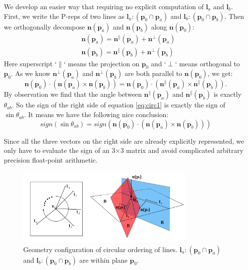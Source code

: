 \documentclass[10pt,journal,compsoc]{IEEEtran}
\begin{document}
We develop an easier way that requiring no explicit computation of $\bm{l}_a$ and $\bm{l}_b$. First, we write the P-reps of two lines as $\bm{l}_a\colon(\bm{p}_0\cap\bm{p}_a)$ and $\bm{l}_b\colon(\bm{p}_0\cap\bm{p}_b)$. Then we orthogonally decompose $\bm{n}(\bm{p}_a)$ and $\bm{n}(\bm{p}_b)$ along $\bm{n}(\bm{p}_0)$:
\begin{equation}
\begin{split}
&\bm{n}(\bm{p}_a)= \bm{n}^\parallel(\bm{p}_a) + \bm{n}^\perp(\bm{p}_a)\\
&\bm{n}(\bm{p}_b)= \bm{n}^\parallel(\bm{p}_b) + \bm{n}^\perp(\bm{p}_b)
\end{split}
\end{equation}
Here superscript `$\parallel$` means the projection on $\bm{p}_0$ and `$\perp$` means orthogonal to $\bm{p}_0$. As we know $\bm{n}^\perp(\bm{p}_a)$ and $\bm{n}^\perp(\bm{p}_b)$ are both parallel to $\bm{n}(\bm{p}_0)$, we get:
\begin{equation}
\label{eq:circ1}
\bm{n}(\bm{p}_0) \cdot (\bm{n}(\bm{p}_a) \times \bm{n}(\bm{p}_b)) = \bm{n}(\bm{p}_0) \cdot (\bm{n}^\parallel(\bm{p}_a) \times \bm{n}^\parallel(\bm{p}_b)).
\end{equation}
By observation we find that the angle between $\bm{n}^\parallel(\bm{p}_a)$ and $\bm{n}^\parallel(\bm{p}_b)$ is exactly $\theta_{ab}$. So the sign of the right side of equation \ref{eq:circ1} is exactly the sign of $\sin{\theta_{ab}}$. It means we have the following nice conclusion:
\begin{equation}
\label{eq:circ2}
sign(\sin{\theta_{ab}})=  sign(\bm{n}(\bm{p}_0)\cdot(\bm{n}(\bm{p}_a) \times \bm{n}(\bm{p}_b)))
\end{equation}

Since all the three vectors on the right side are already explicitly represented, we only have to evaluate the sign of an 3$\times$3 matrix and avoid complicated arbitrary precision float-point arithmetic.

\begin{figure}[t]
\centering
\includegraphics[width=3.5in]{circularorder}
\caption{Geometry configuration of circular ordering of lines. $\bm{l}_a\colon(\bm{p}_0 \cap \bm{p}_a)$ and $\bm{l}_b\colon(\bm{p}_0 \cap \bm{p}_b)$ are within plane $\bm{p}_0$.}
\label{fig:circularorder}
\end{figure}
\end{document}
